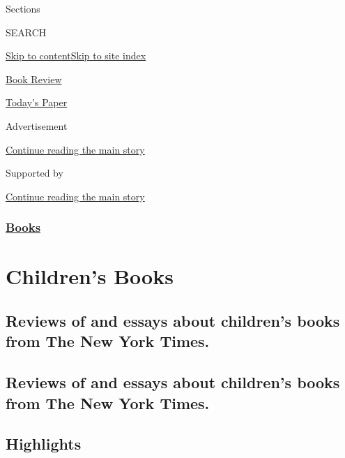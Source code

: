 Sections

SEARCH

\protect\hyperlink{site-content}{Skip to
content}\protect\hyperlink{site-index}{Skip to site index}

\href{https://www.nytimes.com/section/books/review}{Book Review}

\href{https://myaccount.nytimes.com/auth/login?response_type=cookie\&client_id=vi}{}

\href{https://www.nytimes.com/section/todayspaper}{Today's Paper}

Advertisement

\protect\hyperlink{after-top}{Continue reading the main story}

Supported by

\protect\hyperlink{after-sponsor}{Continue reading the main story}

\hypertarget{books}{%
\subsubsection{\texorpdfstring{\href{/section/books}{Books}}{Books}}\label{books}}

\hypertarget{childrens-books}{%
\section{Children's Books}\label{childrens-books}}

\hypertarget{reviews-of-and-essays-about-childrens-books-from-the-new-york-times}{%
\subsection{Reviews of and essays about children's books from The New
York
Times.}\label{reviews-of-and-essays-about-childrens-books-from-the-new-york-times}}

\hypertarget{reviews-of-and-essays-about-childrens-books-from-the-new-york-times-1}{%
\subsection{Reviews of and essays about children's books from The New
York
Times.}\label{reviews-of-and-essays-about-childrens-books-from-the-new-york-times-1}}

\hypertarget{highlights}{%
\subsection{Highlights}\label{highlights}}

